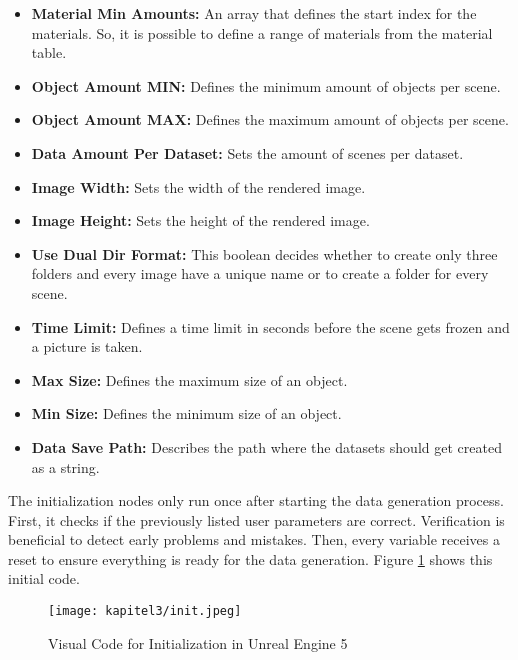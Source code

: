 \begin{itemize}
			\item \textbf{Material Min Amounts:} An array that defines the start index for the materials. So, it is possible to define a range of materials from the material table.
			\item \textbf{Object Amount MIN:} Defines the minimum amount of objects per scene.
			\item \textbf{Object Amount MAX:} Defines the maximum amount of objects per scene.
			\item \textbf{Data Amount Per Dataset:} Sets the amount of scenes per dataset. 
			\item \textbf{Image Width:} Sets the width of the rendered image.
			\item \textbf{Image Height:} Sets the height of the rendered image.
			\item \textbf{Use Dual Dir Format:} This boolean decides whether to create only three folders and every image have a unique name or to create a folder for every scene.
			\item \textbf{Time Limit:} Defines a time limit in seconds before the scene gets frozen and a picture is taken.
			\item \textbf{Max Size:} Defines the maximum size of an object.
			\item \textbf{Min Size:} Defines the minimum size of an object.
			\item \textbf{Data Save Path:} Describes the path where the datasets should get created as a string.
		\end{itemize}
		
		The initialization nodes only run once after starting the data generation process. First, it checks if the previously listed user parameters are correct. Verification is beneficial to detect early problems and mistakes. Then, every variable receives a reset to ensure everything is ready for the data generation. Figure \ref{img:ue5_init} shows this initial code.
		
		\begin{figure}[h]
			\centering
			\texttt{[image: kapitel3/init.jpeg]}
			\caption[Visual Code for Initialization in Unreal Engine 5 by Tobia Ippolito]{Visual Code for Initialization in Unreal Engine 5}
			\label{img:ue5_init}
		\end{figure}
		
